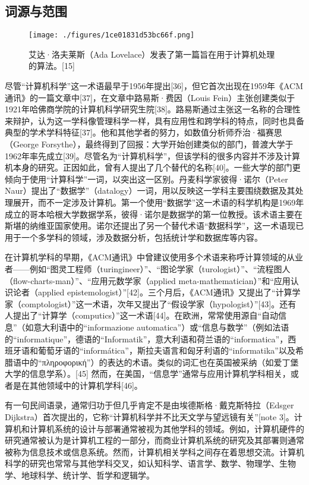 \subsection{词源与范围}
\begin{figure}[ht]
\centering
\texttt{[image: ./figures/1ce01831d53bc66f.png]}
\caption{艾达·洛夫莱斯（Ada Lovelace）发表了第一篇旨在用于计算机处理的算法。[15]} \label{fig_JSS_3}
\end{figure}
尽管“计算机科学”这一术语最早于1956年提出[36]，但它首次出现在1959年《ACM通讯》的一篇文章中[37]，在文章中路易斯·费因（Louis Fein）主张创建类似于1921年哈佛商学院的计算机科学研究生院[38]。路易斯通过主张这一名称的合理性来辩护，认为这一学科像管理科学一样，具有应用性和跨学科的特点，同时也具备典型的学术学科特征[37]。他和其他学者的努力，如数值分析师乔治·福赛思（George Forsythe），最终得到了回报：大学开始创建类似的部门，普渡大学于1962年率先成立[39]。尽管名为“计算机科学”，但该学科的很多内容并不涉及计算机本身的研究。正因如此，曾有人提出了几个替代的名称[40]。一些大学的部门更倾向于使用“计算科学”一词，以突出这一区别。丹麦科学家彼得·诺尔（Peter Naur）提出了“数据学”（datalogy）一词，用以反映这一学科主要围绕数据及其处理展开，而不一定涉及计算机。第一个使用“数据学”这一术语的科学机构是1969年成立的哥本哈根大学数据学系，彼得·诺尔是数据学的第一位教授。该术语主要在斯堪的纳维亚国家使用。诺尔还提出了另一个替代术语“数据科学”，这一术语现已用于一个多学科的领域，涉及数据分析，包括统计学和数据库等内容。

在计算机学科的早期，《ACM通讯》中曾建议使用多个术语来称呼计算领域的从业者——例如“图灵工程师（turingineer）”、“图论学家（turologist）”、“流程图人（flow-charts-man）”、“应用元数学家（applied meta-mathematician）”和“应用认识论者（applied epistemologist）”[42]。三个月后，《ACM通讯》又提出了“计算学家（comptologist）”这一术语，次年又提出了“假设学家（hypologist）”[43]。还有人提出了“计算学（computics）”这一术语[44]。在欧洲，常常使用源自“自动信息”（如意大利语中的“informazione automatica”）或“信息与数学”（例如法语的“informatique”，德语的“Informatik”，意大利语和荷兰语的“informatica”，西班牙语和葡萄牙语的“informática”，斯拉夫语言和匈牙利语的“informatika”以及希腊语中的“πληροφορική”）的表达的术语。类似的词汇也在英国被采纳（如爱丁堡大学的信息学系）。[45] 然而，在美国，“信息学”通常与应用计算机学科相关，或者是在其他领域中的计算机学科[46]。

有一句民间语录，通常归功于但几乎肯定不是由埃德斯格·戴克斯特拉（Edsger Dijkstra）首次提出的，它称“计算机科学并不比天文学与望远镜有关”[note 3]。计算机和计算机系统的设计与部署通常被视为其他学科的领域。例如，计算机硬件的研究通常被认为是计算机工程的一部分，而商业计算机系统的研究及其部署则通常被称为信息技术或信息系统。然而，计算机相关学科之间存在着思想交流。计算机科学的研究也常常与其他学科交叉，如认知科学、语言学、数学、物理学、生物学、地球科学、统计学、哲学和逻辑学。

